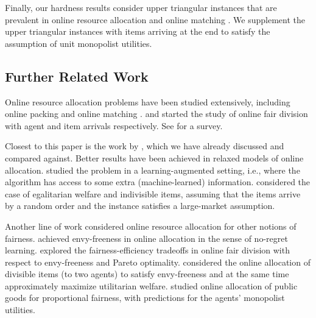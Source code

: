 \documentclass[11pt,letterpaper]{article}
\begin{document}
Finally, our hardness results consider upper triangular instances that are prevalent in online resource allocation and online matching \citep*[e.g.,][]{KarpVV:STOC:1990, KalyanasundaramP:TCS:2000}.
We supplement the upper triangular instances with items arriving at the end to satisfy the assumption of unit monopolist utilities.






\subsection{Further Related Work}


Online resource allocation problems have been studied extensively, including online packing \citep{AlonAABN:TALG:2006, BuchbinderN:MOR:2009} and online matching \citep{KarpVV:STOC:1990, Mehta:FTTCS:2013, HuangTW:SIGecom:2024}.
\citet{Walsh:ADT:2011} and \citet{AleksandrovAGW:IJCAI:2015} started the study of online fair division with agent and item arrivals respectively.
See \citet{AleksandrovW:AAAI:2020} for a survey.

Closest to this paper is the work by \citet{BarmanKM:AAAI:2022}, which we have already discussed and compared against.
Better results have been achieved in relaxed models of online allocation.
\citet{CohenP:ICALP:2023} studied the problem in a learning-augmented setting, i.e., where the algorithm has access to some extra (machine-learned) information. 
\citet{HajiaghayiPKS:NeurIPS:2022} considered the case of egalitarian welfare and indivisible items, assuming that the items arrive by a random order and the instance satisfies a large-market assumption.





Another line of work considered online resource allocation
for other notions of fairness.
\citet{BenadeKPP:EC:2018} achieved envy-freeness in online allocation in the sense of no-regret learning.
\citet{ZengP:EC:2020} explored the fairness-efficiency tradeoffs in online fair division with respect to envy-freeness and Pareto optimality.
\citet{GkatzelisPT:AAAI:2021} considered the online allocation of divisible items (to two agents) to satisfy envy-freeness and at the same time approximately maximize utilitarian welfare.
\citet{BanerjeeGHJMS:IJCAI:2023} studied online allocation of public goods for proportional fairness, with predictions for the agents' monopolist utilities.
\end{document}
